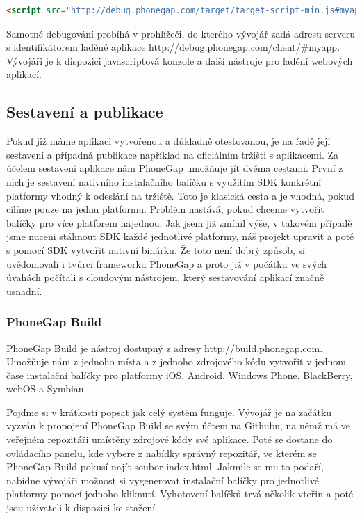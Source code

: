 \begin{lstlisting}[language=HTML,breaklines=true]
<script src="http://debug.phonegap.com/target/target-script-min.js#myapp"></script>
\end{lstlisting}

Samotné debugování probíhá v prohlížeči, do kterého vývojář zadá adresu serveru s identifikátorem laděné aplikace http://debug.phonegap.com/client/\#myapp. Vývojáři je k dispozici javascriptová konzole a další nástroje pro ladění webových aplikací.

\subsection{Sestavení a publikace}
Pokud již máme aplikaci vytvořenou a důkladně otestovanou, je na řadě její sestavení a případná publikace například na oficiálním tržišti s aplikacemi. Za účelem sestavení aplikace nám PhoneGap umožňuje jít dvěma cestami. První z nich je sestavení nativního instalačního balíčku s využitím SDK konkrétní platformy vhodný k odeslání na tržiště. Toto je klasická cesta a je vhodná, pokud cílíme pouze na jednu platformu. Problém nastává, pokud chceme vytvořit balíčky pro více platforem najednou. Jak jsem již zmínil výše, v takovém případě jsme nuceni stáhnout SDK každé jednotlivé platformy, náš projekt upravit a poté s pomocí SDK vytvořit nativní binárku. Že toto není dobrý způsob, si uvědomovali i tvůrci frameworku PhoneGap a proto již v počátku ve svých úvahách počítali s cloudovým nástrojem, který sestavování aplikací značně usnadní.

\subsubsection{PhoneGap Build} \label{Sec:PhoneGapBuild}
PhoneGap Build je nástroj dostupný z adresy http://build.phonegap.com. Umožňuje nám z jednoho místa a z jednoho zdrojového kódu vytvořit v jednom čase instalační balíčky pro platformy iOS, Android, Windows Phone, BlackBerry, webOS a Symbian.

Pojďme si v krátkosti popsat jak celý systém funguje. Vývojář je na začátku vyzván k propojení PhoneGap Build se svým účtem na Githubu, na němž má ve veřejném repozitáři umístěny zdrojové kódy své aplikace. Poté se dostane do ovládacího panelu, kde vybere z nabídky správný repozitář, ve kterém se PhoneGap Build pokusí najít soubor index.html. Jakmile se mu to podaří, nabídne vývojáři možnost si vygenerovat instalační balíčky pro jednotlivé platformy pomocí jednoho kliknutí. Vyhotovení balíčků trvá několik vteřin a poté jsou uživateli k dispozici ke stažení.

